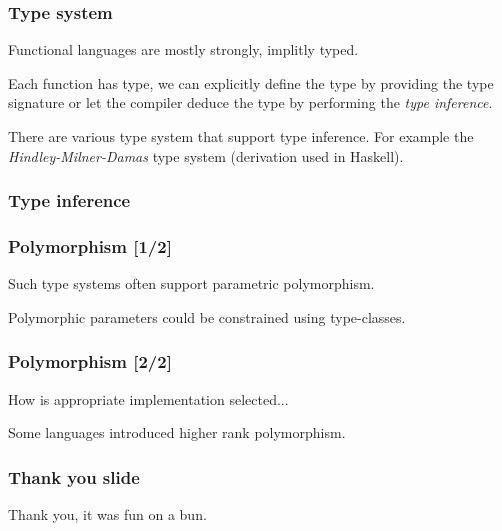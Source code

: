 \documentclass{beamer}
\begin{document}

\begin{frame} \frametitle{Type system}
  Functional languages are mostly strongly, implitly typed.

  \vspace{5pt}
  Each function has type, we can explicitly define the type by providing the
  type signature or let the compiler deduce the type by performing the
  \textit{type inference}.
  \fplus

  There are various type system that support type inference. For example
  the \textit{Hindley-Milner-Damas} type system (derivation used in Haskell).

\end{frame}

\begin{frame} \frametitle{Type inference}

\end{frame}




\begin{frame} \frametitle{Polymorphism [1/2]}
Such type systems often support parametric polymorphism.
\fpolylist

Polymorphic parameters could be constrained using type-classes.
\fpolyfold
\end{frame}

\begin{frame} \frametitle{Polymorphism [2/2]}
  How is appropriate implementation selected...

  Some languages introduced higher rank polymorphism.
  \fpolyrankn
\end{frame}

\begin{frame} \frametitle{Thank you slide}
  Thank you, it was fun on a bun.
\end{frame}
\end{document}
